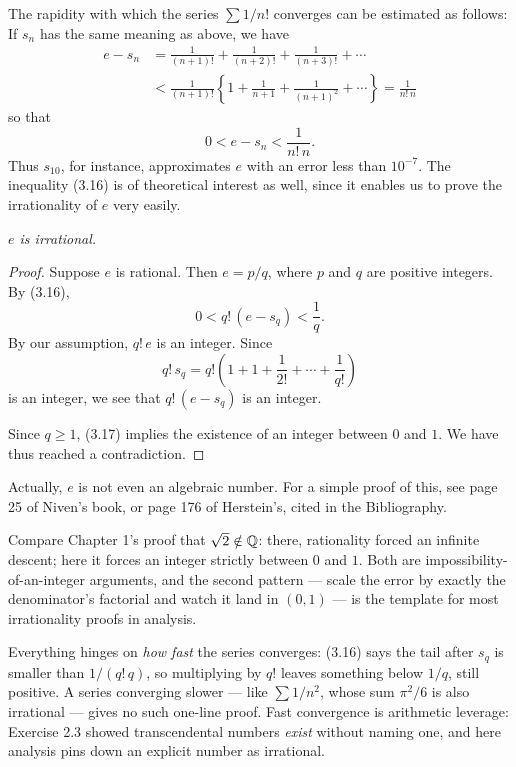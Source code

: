 The rapidity with which the series $\sum 1/n!$ converges can be estimated as
follows: If $s_n$ has the same meaning as above, we have
\begin{align*}
  e - s_n &= \frac{1}{(n+1)!} + \frac{1}{(n+2)!} + \frac{1}{(n+3)!} + \cdots\\
    &< \frac{1}{(n+1)!}\left\{1 + \frac{1}{n+1} + \frac{1}{(n+1)^2} + \cdots
      \right\} = \frac{1}{n!\,n}
\end{align*}
so that
\begin{equation}
  0 < e - s_n < \frac{1}{n!\,n}. \tag{3.16}
\end{equation}
Thus $s_{10}$, for instance, approximates $e$ with an error less than
$10^{-7}$. The inequality (3.16) is of theoretical interest as well, since it
enables us to prove the irrationality of $e$ very easily.

\emph{$e$ is irrational.}

\begin{proof}
Suppose $e$ is rational. Then $e = p/q$, where $p$ and $q$ are positive
integers. By (3.16),
\begin{equation}
  0 < q!\,(e-s_q) < \frac{1}{q}. \tag{3.17}
\end{equation}
By our assumption, $q!\,e$ is an integer. Since
\[ q!\,s_q = q!\left(1+1+\frac{1}{2!}+\cdots+\frac{1}{q!}\right) \]
is an integer, we see that $q!\,(e-s_q)$ is an integer.

Since $q \ge 1$, (3.17) implies the existence of an integer between $0$ and
$1$. We have thus reached a contradiction.
\end{proof}

Actually, $e$ is not even an algebraic number. For a simple proof of this, see
page 25 of Niven's book, or page 176 of Herstein's, cited in the Bibliography.

\begin{deeper}
Compare Chapter 1's proof that $\sqrt2 \notin \mathbb{Q}$: there, rationality forced an
infinite descent; here it forces an integer strictly between $0$ and $1$. Both
are impossibility-of-an-integer arguments, and the second pattern --- scale the
error by exactly the denominator's factorial and watch it land in $(0,1)$ ---
is the template for most irrationality proofs in analysis.

Everything hinges on \emph{how fast} the series converges: (3.16) says the
tail after $s_q$ is smaller than $1/(q!\,q)$, so multiplying by $q!$ leaves
something below $1/q$, still positive. A series converging slower --- like
$\sum 1/n^2$, whose sum $\pi^2/6$ is also irrational --- gives no such
one-line proof. Fast convergence is arithmetic leverage: Exercise 2.3 showed transcendental
numbers \emph{exist} without naming one, and here analysis pins down an
explicit number as irrational.
\end{deeper}
